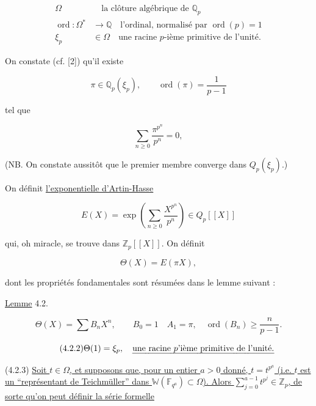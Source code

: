 \begin{align}
\tag{4.1.1}
\Omega&\quad\text{la clôture algébrique de }\mathbb Q_p\\
\tag{4.1.2}
\operatorname{ord}:\Omega^*&\longrightarrow\mathbb Q
\quad\text{l'ordinal, normalisé par }\operatorname{ord}(p)=1\\
\tag{4.1.3}
\xi_p&\in\Omega
\quad\text{une racine $p$-ième primitive de l'unité.}
\end{align}

On constate (cf. [2]) qu'il existe

\begin{equation}\tag{4.1.4}
\pi\in\mathbb Q_p(\xi_p),\qquad
\operatorname{ord}(\pi)=\frac1{p-1}
\end{equation}

tel que

\begin{equation}\tag{4.1.5}
\sum_{n\geq0}\frac{\pi^{p^n}}{p^n}=0,
\end{equation}

(NB. On constate aussitôt que le premier membre converge dans
$Q_p(\xi_p)$.)

On définit \underline{l'exponentielle d'Artin-Hasse}

\begin{equation}\tag{4.1.6}
E(X)=\exp\!\left(\sum_{n\geq0}\frac{X^{p^n}}{p^n}\right)
\in Q_p[[X]]
\end{equation}

qui, oh miracle, se trouve dans $\mathbb Z_p[[X]]$. On définit

\begin{equation}\tag{4.1.7}
\Theta(X)=E(\pi X),
\end{equation}

dont les propriétés fondamentales sont résumées dans le lemme suivant :

\underline{Lemme} 4.2.

\begin{equation}\tag{4.2.1}
\Theta(X)=\sum B_nX^n,\qquad B_0=1\quad A_1=\pi,\quad
\operatorname{ord}(B_n)\geq\frac n{p-1}.
\end{equation}

\begin{equation}\tag{4.2.2}
\Theta(1)=\xi_p,\quad
\text{\uline{une racine $p$'ième primitive de l'unité.}}
\end{equation}

(4.2.3) \underline{Soit $t\in\Omega$, et supposons que, pour un entier
$a>0$ donné, $t=t^{p^a}$ (i.e. $t$ est un ``représentant de Teichmüller''
dans $\mathbb W(\mathbb F_{q^a})\subset\Omega$). Alors
$\sum_{j=0}^{a-1}t^{p^j}\in\mathbb Z_p$, de sorte qu'on peut définir la
série formelle}


